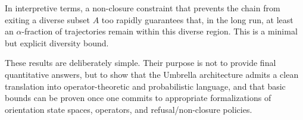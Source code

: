 \documentclass[11pt]{article}
\begin{document}
In interpretive terms, a non-closure constraint that prevents the chain from exiting a diverse subset \(A\) too rapidly guarantees that, in the long run, at least an \(\alpha\)-fraction of trajectories remain within this diverse region. This is a minimal but explicit diversity bound.

\bigskip

\noindent
These results are deliberately simple. Their purpose is not to provide final quantitative answers, but to show that the Umbrella architecture admits a clean translation into operator-theoretic and probabilistic language, and that basic bounds can be proven once one commits to appropriate formalizations of orientation state spaces, operators, and refusal/non-closure policies.


\nocite{*}
  

\end{document}

